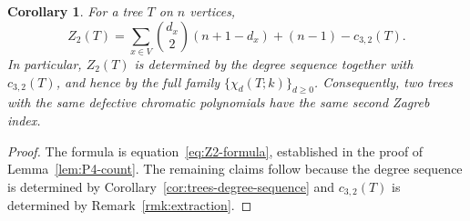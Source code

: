 \documentclass[12pt,reqno]{amsart}
\newtheorem{cor}[thm]{Corollary}
\theoremstyle{definition}
\begin{document}
\begin{cor}\label{cor:zagreb-dcp}
For a tree $T$ on $n$ vertices,
\[
Z_2(T) = \sum_{x\in V}\binom{d_x}{2}(n+1-d_x)+(n-1)-c_{3,2}(T).
\]
In particular, $Z_2(T)$ is determined by the degree sequence together with $c_{3,2}(T)$, and hence by the full family $\{\chi_d(T;k)\}_{d\geq 0}$. Consequently, two trees with the same defective chromatic polynomials have the same second Zagreb index.
\end{cor}

\begin{proof}
The formula is equation~\eqref{eq:Z2-formula}, established in the proof of Lemma~\ref{lem:P4-count}. The remaining claims follow because the degree sequence is determined by Corollary~\ref{cor:trees-degree-sequence} and $c_{3,2}(T)$ is determined by Remark~\ref{rmk:extraction}.
\end{proof}
\end{document}
